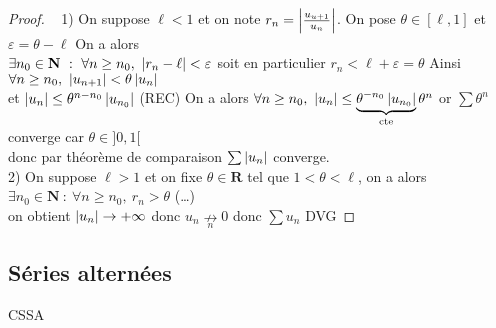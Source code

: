 		\begin{proof} ~ \newline
			{\small 1)} On suppose $\ell<1$ et on note $r_n = \left\vert \frac{u_{u+1}}{u_n} \right\vert$. On pose $\theta \in [\ell,1] $ et $\varepsilon = \theta -\ell$
			On a alors \\ $\exists n_0 \in \mathbf{N} ~:~ \forall n\geq n_0 ,~\left\vert r_n -\ell \right\vert <\varepsilon$  soit en particulier $r_n < \ell+\varepsilon 
			=\theta$ Ainsi $\forall n\geq n_0 ,~\left\vert u_{n+1} \right\vert < \theta\left\vert u_n \right\vert$ \\ et $ \left\vert u_n \right\vert \leq \theta^{n-n_0} \left\vert u_{n_0} \right\vert$ {\small (REC) }
			On a alors $\forall n\geq n_0 ,~\left\vert u_n \right\vert \leq \underbrace{\theta^{-n_0} \left\vert u_{n_0} \right\vert}_{\mathrm{cte}} \theta^n$ 
			or $\sum\theta^n$ converge car $\theta \in ]0,1[$ \\donc par théorème de comparaison $\sum \left\vert u_n \right\vert $ converge.
			\vspace*{0.2cm}\\ {\small 2)} On suppose $\ell>1$ et on fixe $\theta \in \mathbf{R}$ tel que $ 1<\theta <\ell$, 
			on a alors $\exists n_0 \in \mathbf{N} ~:~\forall n\geq n_0 ,~r_n > \theta$ (\dots)\\
			on obtient $\left\vert u_n \right\vert \to +\infty$ donc $u_n \underset{n}{\nrightarrow} 0$ donc $\sum u_n$ DVG
		\end{proof}
	
	\subsection{Séries alternées}
		

		{CSSA}


